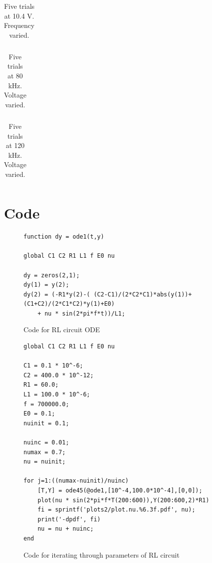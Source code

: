 \documentclass[12pt]{report}
\begin{document}
	\begin{table}[h]
		\centering
		\begin{tabular}{|c|c|c|c|c|}
			\hline
			 
		\end{tabular}
		\caption{Five trials at 10.4 V. Frequency varied.}
		\label{tab:chaos3}
	\end{table}

	\begin{table}[h] 
		\centering
		\begin{tabular}{|l|l|l|l|l|l|l|l|l|l|l|l|}
			\hline
			 
		\end{tabular}
		\caption{Five trials at 80 kHz. Voltage varied.}
		\label{tab:chaos2}
	\end{table}
	
	\begin{table}[h]
		\centering
		\begin{tabular}{|l|l|l|l|l|l|l|l|l|l|l|l|}
			\hline
			 
		\end{tabular}
		\caption{Five trials at 120 kHz. Voltage varied.}
		\label{tab:chaos2}
	\end{table}

\section{Code}
\label{sec: Code}

\begin{figure}[h]
\begin{lstlisting}
function dy = ode1(t,y)

global C1 C2 R1 L1 f E0 nu

dy = zeros(2,1);
dy(1) = y(2);
dy(2) = (-R1*y(2)-( (C2-C1)/(2*C2*C1)*abs(y(1))+ (C1+C2)/(2*C1*C2)*y(1)+E0)
	+ nu * sin(2*pi*f*t))/L1;
\end{lstlisting}
\caption{Code for RL circuit ODE}
\label{code:ode}
\end{figure}

\begin{figure}[h]
\begin{lstlisting}
global C1 C2 R1 L1 f E0 nu

C1 = 0.1 * 10^-6;
C2 = 400.0 * 10^-12;
R1 = 60.0;
L1 = 100.0 * 10^-6;
f = 700000.0;
E0 = 0.1;
nuinit = 0.1;

nuinc = 0.01;
numax = 0.7;
nu = nuinit;

for j=1:((numax-nuinit)/nuinc)
    [T,Y] = ode45(@ode1,[10^-4,100.0*10^-4],[0,0]);
    plot(nu * sin(2*pi*f*T(200:600)),Y(200:600,2)*R1)
    fi = sprintf('plots2/plot.nu.%6.3f.pdf', nu);
    print('-dpdf', fi)
    nu = nu + nuinc;
end
\end{lstlisting}
	\caption{Code for iterating through parameters of RL circuit}
	\label{code:run}
\end{figure}



\end{document}
